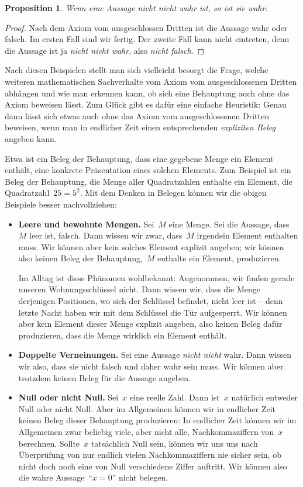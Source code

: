 \documentclass[twoside]{../zirkelblatt}
\theoremstyle{definition}
\theoremstyle{plain}
\newtheorem{prop}[defn]{Proposition}
\theoremstyle{remark}
\begin{document}
\begin{prop}Wenn eine Aussage \emph{nicht nicht} wahr ist, so ist sie wahr.
\end{prop}
\begin{proof}Nach dem Axiom vom ausgeschlossen Dritten ist die Aussage wahr
oder falsch. Im ersten Fall sind wir fertig. Der zweite Fall kann nicht
eintreten, denn die Aussage ist ja \emph{nicht nicht wahr}, also \emph{nicht
falsch}.
\end{proof}

Nach diesen Beispielen stellt man sich vielleicht besorgt die Frage, welche
weiteren mathematischen Sachverhalte vom Axiom vom ausgeschlossenen Dritten
abhängen und wie man erkennen kann, ob sich eine Behauptung auch ohne das Axiom
beweisen lässt. Zum Glück gibt es dafür eine einfache Heuristik: Genau dann
lässt sich etwas auch ohne das Axiom vom ausgeschlossenen Dritten beweisen,
wenn man in endlicher Zeit einen entsprechenden \emph{expliziten Beleg} angeben
kann.

Etwa ist ein Beleg der Behauptung, dass eine gegebene Menge ein Element
enthält, eine konkrete Präsentation eines solchen Elements. Zum Beispiel ist ein Beleg der
Behauptung, die Menge aller Quadratzahlen enthalte ein Element, die
Quadratzahl~$25 = 5^2$. Mit dem Denken in Belegen können wir die obigen
Beispiele besser nachvollziehen:

\begin{itemize}
\item \textbf{Leere und bewohnte Mengen.} Sei~$M$ eine Menge. Sei die Aussage,
dass~$M$ leer ist, falsch. Dann wissen wir zwar, dass~$M$ irgendein Element
enthalten muss. Wir können aber kein solches Element explizit angeben; wir
können also keinen Beleg der Behauptung,~$M$ enthalte ein Element, produzieren.

Im Alltag ist diese Phänomen wohlbekannt: Angenommen, wir finden gerade unseren
Wohnungsschlüssel nicht. Dann wissen wir, dass die Menge derjenigen Positionen, wo
sich der Schlüssel befindet, nicht leer ist -- denn letzte Nacht haben wir mit
dem Schlüssel die Tür aufgesperrt. Wir können aber kein Element dieser Menge
explizit angeben, also keinen Beleg dafür produzieren, dass die Menge wirklich
ein Element enthält.
\item \textbf{Doppelte Verneinungen.} Sei eine Aussage \emph{nicht nicht} wahr.
Dann wissen wir also, dass sie nicht falsch und daher wahr sein muss. Wir
können aber trotzdem keinen Beleg für die Aussage angeben.
\item \textbf{Null oder nicht Null.} Sei~$x$ eine reelle Zahl. Dann ist~$x$
natürlich entweder Null oder nicht Null. Aber im Allgemeinen können wir in
endlicher Zeit keinen Beleg dieser Behauptung produzieren: In endlicher Zeit
können wir im Allgemeinen zwar beliebig viele, aber nicht alle,
Nachkommaziffern von~$x$ berechnen. Sollte~$x$ tatsächlich Null sein, können
wir uns uns nach Überprüfung von nur endlich vielen Nachkommaziffern nie sicher
sein, ob nicht doch noch eine von Null verschiedene Ziffer auftritt. Wir können
also die wahre Aussage~"`$x = 0$"' nicht belegen.
\end{itemize}
\end{document}
